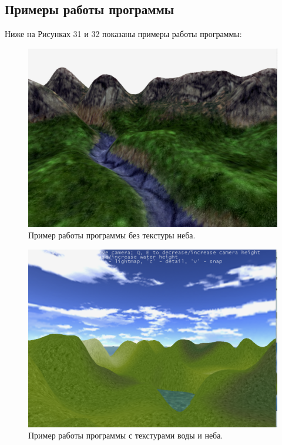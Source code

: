\documentclass[a4paper, 10pt]{article}
\begin{document}
	\subsection{Примеры работы программы}
	\hspace*{5mm} Ниже на Рисунках 31 и 32 показаны примеры работы программы:
	\begin{figure}[h]
		\centering \includegraphics[scale=0.6]{primer1}
		\centering\caption{Пример работы программы без текстуры неба.}
	\end{figure}
	\begin{figure}[h!]
		\centering \includegraphics[scale=0.6]{primer2}
		\centering\caption{Пример работы программы с текстурами воды и неба.}
	\end{figure}
	\clearpage
	\newpage
\end{document}
